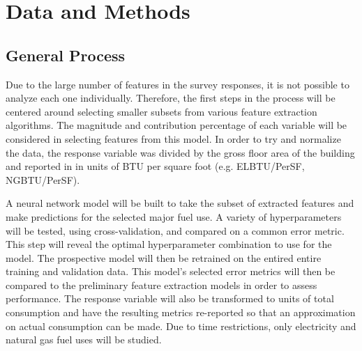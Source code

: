 \section{Data and Methods}
\subsection{General Process}

Due to the large number of features in the survey responses, it is not possible to analyze each one individually.  Therefore, the first steps in the process will be centered around selecting smaller subsets from various feature extraction algorithms.  The magnitude and contribution percentage of each variable will be considered in selecting features from this model.  In order to try and normalize the data, the response variable was divided by the gross floor area of the building and reported in in units of BTU per square foot (e.g. ELBTU/PerSF, NGBTU/PerSF). 

A neural network model will be built to take the subset of extracted features and make predictions for the selected major fuel use.  A variety of hyperparameters will be tested, using cross-validation, and compared on a common error metric.  This step will reveal the optimal hyperparameter combination to use for the model.  The prospective model will then be retrained on the entired entire training and validation data.  This model's selected error metrics will then be compared to the preliminary feature extraction models in order to assess performance.  The response variable will also be transformed to units of total consumption and have the resulting metrics re-reported so that an approximation on actual consumption can be made.  Due to time restrictions, only electricity and natural gas fuel uses will be studied.